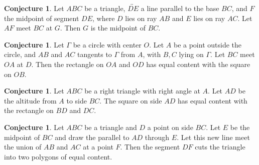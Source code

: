 \documentclass{tufte-handout}
\theoremstyle{definition}
\newtheorem{conjecture}[problem]{Conjecture}
\begin{document}
\begin{conjecture}\label{conj:content-triangle}
Let $ABC$ be a triangle, $\overleftrightarrow{DE}$ a line parallel to the base $BC$, and $F$ the midpoint of segment $DE$, where $D$ lies on ray $AB$ and $E$ lies on ray $AC$. Let $AF$ meet $BC$ at $G$. Then $G$ is the midpoint of $BC$.
\end{conjecture}


\begin{conjecture}\label{conj:content-circle}
Let $\Gamma$ be a circle with center $O$. Let $A$ be a point outside the circle, and $AB$ and $AC$ tangents to $\Gamma$ from $A$, with $B, C$ lying on $\Gamma$. Let $BC$ meet $OA$ at $D$. Then the rectangle on $OA$ and $OD$ has equal content with the square on $OB$.
\end{conjecture}

\begin{conjecture}\label{conj:right-triangle-similarity}
Let $ABC$ be a right triangle with right angle at $A$. Let $AD$ be the altitude from $A$ to side $BC$. The square on side $AD$ has equal content with the rectangle on $BD$ and $DC$.
\end{conjecture}

\begin{conjecture}\label{conj:divide-triangle}
Let $ABC$ be a triangle and $D$ a point on side $BC$. Let $E$ be the midpoint of $BC$ and draw the parallel to $AD$ through $E$. Let this new line meet the union of $AB$ and $AC$ at a point $F$. Then the segment $DF$ cuts the triangle into two polygons of equal content.
\end{conjecture}


\vfill
\end{document}
